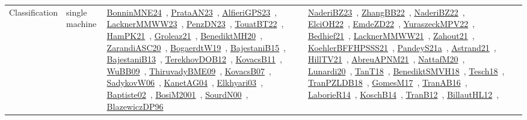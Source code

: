 {\begin{longtable}{lp{3cm}>{\raggedright\arraybackslash}p{6cm}>{\raggedright\arraybackslash}p{6cm}>{\raggedright\arraybackslash}p{8cm}}
Classification & single machine & \href{../works/BonninMNE24.pdf}{BonninMNE24}~\cite{BonninMNE24}, \href{../works/PrataAN23.pdf}{PrataAN23}~\cite{PrataAN23}, \href{../works/AlfieriGPS23.pdf}{AlfieriGPS23}~\cite{AlfieriGPS23}, \href{../works/LacknerMMWW23.pdf}{LacknerMMWW23}~\cite{LacknerMMWW23}, \href{../works/PenzDN23.pdf}{PenzDN23}~\cite{PenzDN23}, \href{../works/TouatBT22.pdf}{TouatBT22}~\cite{TouatBT22}, \href{../works/HamPK21.pdf}{HamPK21}~\cite{HamPK21}, \href{../works/Groleaz21.pdf}{Groleaz21}~\cite{Groleaz21}, \href{../works/BenediktMH20.pdf}{BenediktMH20}~\cite{BenediktMH20}, \href{../works/ZarandiASC20.pdf}{ZarandiASC20}~\cite{ZarandiASC20}, \href{../works/BogaerdtW19.pdf}{BogaerdtW19}~\cite{BogaerdtW19}, \href{../works/BajestaniB15.pdf}{BajestaniB15}~\cite{BajestaniB15}, \href{../works/BajestaniB13.pdf}{BajestaniB13}~\cite{BajestaniB13}, \href{../works/TerekhovDOB12.pdf}{TerekhovDOB12}~\cite{TerekhovDOB12}, \href{../works/KovacsB11.pdf}{KovacsB11}~\cite{KovacsB11}, \href{../works/WuBB09.pdf}{WuBB09}~\cite{WuBB09}, \href{../works/ThiruvadyBME09.pdf}{ThiruvadyBME09}~\cite{ThiruvadyBME09}, \href{../works/KovacsB07.pdf}{KovacsB07}~\cite{KovacsB07}, \href{../works/SadykovW06.pdf}{SadykovW06}~\cite{SadykovW06}, \href{../works/KanetAG04.pdf}{KanetAG04}~\cite{KanetAG04}, \href{../works/Elkhyari03.pdf}{Elkhyari03}~\cite{Elkhyari03}, \href{../works/Baptiste02.pdf}{Baptiste02}~\cite{Baptiste02}, \href{../works/BosiM2001.pdf}{BosiM2001}~\cite{BosiM2001}, \href{../works/SourdN00.pdf}{SourdN00}~\cite{SourdN00}, \href{../works/BlazewiczDP96.pdf}{BlazewiczDP96}~\cite{BlazewiczDP96} & \href{../works/NaderiBZ23.pdf}{NaderiBZ23}~\cite{NaderiBZ23}, \href{../works/ZhangBB22.pdf}{ZhangBB22}~\cite{ZhangBB22}, \href{../works/NaderiBZ22.pdf}{NaderiBZ22}~\cite{NaderiBZ22}, \href{../works/ElciOH22.pdf}{ElciOH22}~\cite{ElciOH22}, \href{../works/EmdeZD22.pdf}{EmdeZD22}~\cite{EmdeZD22}, \href{../works/YuraszeckMPV22.pdf}{YuraszeckMPV22}~\cite{YuraszeckMPV22}, \href{../works/Bedhief21.pdf}{Bedhief21}~\cite{Bedhief21}, \href{../works/LacknerMMWW21.pdf}{LacknerMMWW21}~\cite{LacknerMMWW21}, \href{../works/Zahout21.pdf}{Zahout21}~\cite{Zahout21}, \href{../works/KoehlerBFFHPSSS21.pdf}{KoehlerBFFHPSSS21}~\cite{KoehlerBFFHPSSS21}, \href{../works/PandeyS21a.pdf}{PandeyS21a}~\cite{PandeyS21a}, \href{../works/Astrand21.pdf}{Astrand21}~\cite{Astrand21}, \href{../works/HillTV21.pdf}{HillTV21}~\cite{HillTV21}, \href{../works/AbreuAPNM21.pdf}{AbreuAPNM21}~\cite{AbreuAPNM21}, \href{../works/NattafM20.pdf}{NattafM20}~\cite{NattafM20}, \href{../works/Lunardi20.pdf}{Lunardi20}~\cite{Lunardi20}, \href{../works/TanT18.pdf}{TanT18}~\cite{TanT18}, \href{../works/BenediktSMVH18.pdf}{BenediktSMVH18}~\cite{BenediktSMVH18}, \href{../works/Tesch18.pdf}{Tesch18}~\cite{Tesch18}, \href{../works/TranPZLDB18.pdf}{TranPZLDB18}~\cite{TranPZLDB18}, \href{../works/GomesM17.pdf}{GomesM17}~\cite{GomesM17}, \href{../works/TranAB16.pdf}{TranAB16}~\cite{TranAB16}, \href{../works/LaborieR14.pdf}{LaborieR14}~\cite{LaborieR14}, \href{../works/KoschB14.pdf}{KoschB14}~\cite{KoschB14}, \href{../works/TranB12.pdf}{TranB12}~\cite{TranB12}, \href{../works/BillautHL12.pdf}{BillautHL12}~\cite{BillautHL12}, 
\end{longtable}}
